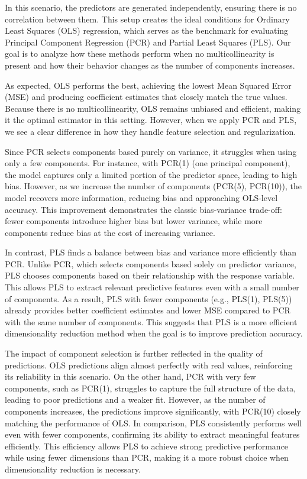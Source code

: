 \documentclass[11pt,twoside,a4paper]{article}
\begin{document}
In this scenario, the predictors are generated independently, ensuring there is no correlation between them. This setup creates the ideal conditions for Ordinary Least Squares (OLS) regression, which serves as the benchmark for evaluating Principal Component Regression (PCR) and Partial Least Squares (PLS). Our goal is to analyze how these methods perform when no multicollinearity is present and how their behavior changes as the number of components increases.

As expected, OLS performs the best, achieving the lowest Mean Squared Error (MSE) and producing coefficient estimates that closely match the true values. Because there is no multicollinearity, OLS remains unbiased and efficient, making it the optimal estimator in this setting. However, when we apply PCR and PLS, we see a clear difference in how they handle feature selection and regularization.  

Since PCR selects components based purely on variance, it struggles when using only a few components. For instance, with PCR(1) (one principal component), the model captures only a limited portion of the predictor space, leading to high bias. However, as we increase the number of components (PCR(5), PCR(10)), the model recovers more information, reducing bias and approaching OLS-level accuracy. This improvement demonstrates the classic bias-variance trade-off: fewer components introduce higher bias but lower variance, while more components reduce bias at the cost of increasing variance.  

In contrast, PLS finds a balance between bias and variance more efficiently than PCR. Unlike PCR, which selects components based solely on predictor variance, PLS chooses components based on their relationship with the response variable. This allows PLS to extract relevant predictive features even with a small number of components. As a result, PLS with fewer components (e.g., PLS(1), PLS(5)) already provides better coefficient estimates and lower MSE compared to PCR with the same number of components. This suggests that PLS is a more efficient dimensionality reduction method when the goal is to improve prediction accuracy.

The impact of component selection is further reflected in the quality of predictions. OLS predictions align almost perfectly with real values, reinforcing its reliability in this scenario. On the other hand, PCR with very few components, such as PCR(1), struggles to capture the full structure of the data, leading to poor predictions and a weaker fit. However, as the number of components increases, the predictions improve significantly, with PCR(10) closely matching the performance of OLS. In comparison, PLS consistently performs well even with fewer components, confirming its ability to extract meaningful features efficiently. This efficiency allows PLS to achieve strong predictive performance while using fewer dimensions than PCR, making it a more robust choice when dimensionality reduction is necessary.
\end{document}

